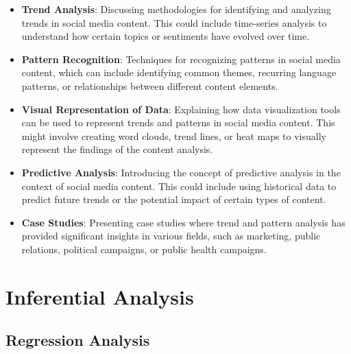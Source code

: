 \documentclass[
]{book}
\providecommand{\tightlist}{%
  \setlength{\itemsep}{0pt}\setlength{\parskip}{0pt}}
\begin{document}
\begin{itemize}
\tightlist
\item
  \textbf{Trend Analysis}: Discussing methodologies for identifying and analyzing trends in social media content. This could include time-series analysis to understand how certain topics or sentiments have evolved over time.
\item
  \textbf{Pattern Recognition}: Techniques for recognizing patterns in social media content, which can include identifying common themes, recurring language patterns, or relationships between different content elements.
\item
  \textbf{Visual Representation of Data}: Explaining how data visualization tools can be used to represent trends and patterns in social media content. This might involve creating word clouds, trend lines, or heat maps to visually represent the findings of the content analysis.
\item
  \textbf{Predictive Analysis}: Introducing the concept of predictive analysis in the context of social media content. This could include using historical data to predict future trends or the potential impact of certain types of content.
\item
  \textbf{Case Studies}: Presenting case studies where trend and pattern analysis has provided significant insights in various fields, such as marketing, public relations, political campaigns, or public health campaigns.
\end{itemize}

\hypertarget{inferential-analysis}{%
\chapter{Inferential Analysis}\label{inferential-analysis}}

\hypertarget{regression-analysis}{%
\section*{Regression Analysis}\label{regression-analysis}}
\end{document}
